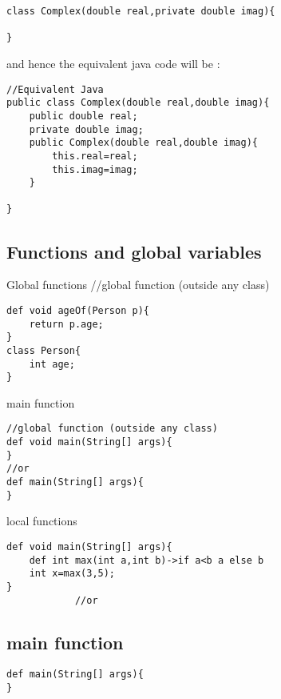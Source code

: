 \documentclass{tufte-book}
\begin{document}
            \begin{lstlisting}
class Complex(double real,private double imag){

}
            \end{lstlisting}
            and hence the equivalent java code will be :

            \begin{lstlisting}
//Equivalent Java
public class Complex(double real,double imag){
    public double real;
    private double imag;
    public Complex(double real,double imag){
        this.real=real;
        this.imag=imag;
    }

}
            \end{lstlisting}



            \subsection{Functions and global variables}
            Global functions
//global function (outside any class)
            \begin{lstlisting}
def void ageOf(Person p){
    return p.age;
}
class Person{
    int age;
}
            \end{lstlisting}
            main function
            \begin{lstlisting}
//global function (outside any class)
def void main(String[] args){
}
//or
def main(String[] args){
}
            \end{lstlisting}
            local functions
            \begin{lstlisting}
def void main(String[] args){
    def int max(int a,int b)->if a<b a else b
    int x=max(3,5);
}
            //or
            \end{lstlisting}


            \subsection{main function}
            \begin{lstlisting}
def main(String[] args){
}
            \end{lstlisting}
\end{document}
